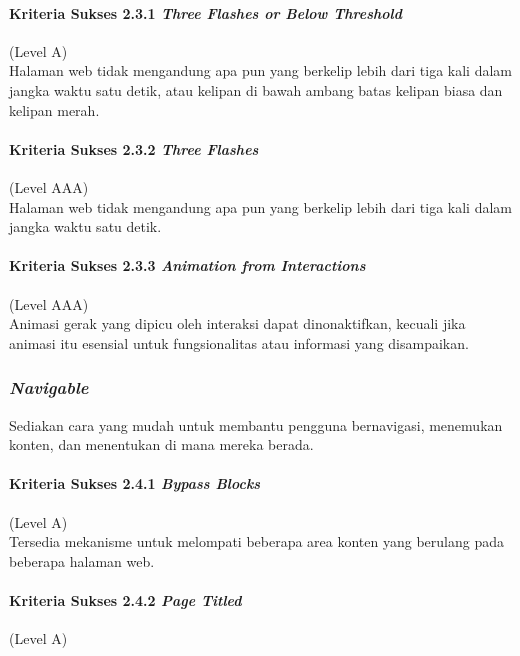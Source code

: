 \paragraph{Kriteria Sukses 2.3.1 \textit{Three Flashes or Below Threshold}}
\label{sec:kriteria_sukses_2.3.1}
(Level A)\\

Halaman web tidak mengandung apa pun yang berkelip lebih dari tiga kali dalam jangka waktu satu detik, atau kelipan di bawah ambang batas kelipan biasa dan kelipan merah.

\paragraph{Kriteria Sukses 2.3.2 \textit{Three Flashes}}
\label{sec:kriteria_sukses_2.3.2}
(Level AAA)\\

Halaman web tidak mengandung apa pun yang berkelip lebih dari tiga kali dalam jangka waktu satu detik.

\paragraph{Kriteria Sukses 2.3.3 \textit{Animation from Interactions}}
\label{sec:kriteria_sukses_2.3.3}
(Level AAA)\\

Animasi gerak yang dipicu oleh interaksi dapat dinonaktifkan, kecuali jika animasi itu esensial untuk fungsionalitas atau informasi yang disampaikan.

\subsubsection{\textit{Navigable}}
\label{sec:navigable}
Sediakan cara yang mudah untuk membantu pengguna bernavigasi, menemukan konten, dan menentukan di mana mereka berada.

\paragraph{Kriteria Sukses 2.4.1 \textit{Bypass Blocks}}
\label{sec:kriteria_sukses_2.4.1}
(Level A)\\

Tersedia mekanisme untuk melompati beberapa area konten yang berulang pada beberapa halaman web.

\paragraph{Kriteria Sukses 2.4.2 \textit{Page Titled}}
\label{sec:kriteria_sukses_2.4.2}
(Level A)\\

